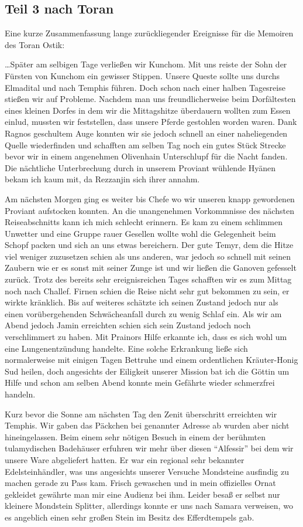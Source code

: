 \subsection{Teil 3 nach Toran}

Eine kurze Zusammenfassung lange zurückliegender Ereignisse für die Memoiren des Toran Ostik:

\dots Später am selbigen Tage verließen wir Kunchom. Mit uns reiste der Sohn der Fürsten von Kunchom ein gewisser Stippen. Unsere Queste sollte uns durchs Elmadital und nach Temphis führen. Doch schon nach einer halben Tagesreise stießen wir auf Probleme. Nachdem man uns freundlicherweise beim Dorfältesten eines kleinen Dorfes in dem wir die Mittagshitze überdauern wollten zum Essen einlud, mussten wir feststellen, dass unsere Pferde gestohlen worden waren. Dank Ragnos geschultem Auge konnten wir sie jedoch schnell an einer naheliegenden Quelle wiederfinden und schafften am selben Tag noch ein gutes Stück Strecke bevor wir in einem angenehmen Olivenhain Unterschlupf für die Nacht fanden. Die nächtliche Unterbrechung durch in unserem Proviant wühlende Hyänen bekam ich kaum mit, da Rezzanjin sich ihrer annahm.

Am nächsten Morgen ging es weiter bis Chefe wo wir unseren knapp gewordenen Proviant aufstocken konnten. An die unangenehmen Vorkommnisse des nächsten Reiseabschnitts kann ich mich schlecht erinnern. Es kam zu einem schlimmen Unwetter und eine Gruppe rauer Gesellen wollte wohl die Gelegenheit beim Schopf packen und sich an uns etwas bereichern. Der gute Temyr, dem die Hitze viel weniger zuzusetzen schien als uns anderen, war jedoch so schnell mit seinen Zaubern wie er es sonst mit seiner Zunge ist und wir ließen die Ganoven gefesselt zurück. Trotz des bereits sehr ereignisreichen Tages schafften wir es zum Mittag noch nach Challef. Firnen schien die Reise nicht sehr gut bekommen zu sein, er wirkte kränklich. Bis auf weiteres schätzte ich seinen Zustand jedoch nur als einen vorübergehenden Schwächeanfall durch zu wenig Schlaf ein. Als wir am Abend jedoch Jamin erreichten schien sich sein Zustand jedoch noch verschlimmert zu haben. Mit Prainors Hilfe erkannte ich, dass es sich wohl um eine Lungenentzündung handelte. Eine solche Erkrankung ließe sich normalerweise mit einigen Tagen Bettruhe und einem ordentlichen Kräuter-Honig Sud heilen, doch angesichts der Eiligkeit unserer Mission bat ich die Göttin um Hilfe und schon am selben Abend konnte mein Gefährte wieder schmerzfrei handeln.

Kurz bevor die Sonne am nächsten Tag den Zenit überschritt erreichten wir Temphis. Wir gaben das Päckchen bei genannter Adresse ab wurden aber nicht hineingelassen. Beim einem sehr nötigen Besuch in einem der berühmten tulamydischen Badehäuser erfuhren wir mehr über diesen ``Alfessir'' bei dem wir unsere Ware abgeliefert hatten. Er war ein regional sehr bekannter Edelsteinhändler, was uns angesichts unserer Versuche Mondsteine ausfindig zu machen gerade zu Pass kam. Frisch gewaschen und in mein offizielles Ornat gekleidet gewährte man mir eine Audienz bei ihm. Leider besaß er selbst nur kleinere Mondstein Splitter, allerdings konnte er uns nach Samara verweisen, wo es angeblich einen sehr großen Stein im Besitz des Efferdtempels gab.

